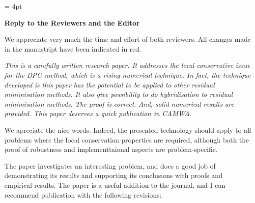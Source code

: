 \documentclass[11pt,c]{article}
\begin{document}
\baselineskip=16pt
\parskip= 4pt


\begin{center}
{\large \bf Reply to the Reviewers and the Editor}
\end{center}


We appreciate very much the time and effort of both reviewers. All changes made in the manustript have been
indicated in red.


{\em This is a  carefully written research paper. It addresses the local conservative issue for the DPG method, 
which is a rising numerical technique. In fact, the technique developed is this paper has the potential 
to be applied to other residual minimisation methods. It also give possibility to do hybridisation to 
residual minimisation methods. The proof is correct. And, solid numerical results 
are provided. This paper deserves a quick publication in CAMWA.}

We apreciate the nice words. Indeed, the presented technology should apply to all problems where
the local conservation properties are required, although both the proof of robustness 
and implementtaional aspects are problem-specific.



The paper investigates an interesting problem, and does a good job of demonstrating its results and supporting its conclusions with proofs and empirical results.  The paper is a useful addition to the journal, and I can recommend publication with the following revisions:
\end{document}
